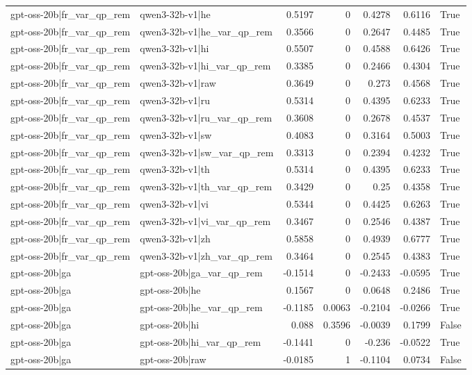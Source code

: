 \begin{table}
\begin{tabular}{l l r r r r l}
gpt-oss-20b|fr_var_qp_rem & qwen3-32b-v1|he & 0.5197 & 0 & 0.4278 & 0.6116 & True \\
gpt-oss-20b|fr_var_qp_rem & qwen3-32b-v1|he_var_qp_rem & 0.3566 & 0 & 0.2647 & 0.4485 & True \\
gpt-oss-20b|fr_var_qp_rem & qwen3-32b-v1|hi & 0.5507 & 0 & 0.4588 & 0.6426 & True \\
gpt-oss-20b|fr_var_qp_rem & qwen3-32b-v1|hi_var_qp_rem & 0.3385 & 0 & 0.2466 & 0.4304 & True \\
gpt-oss-20b|fr_var_qp_rem & qwen3-32b-v1|raw & 0.3649 & 0 & 0.273 & 0.4568 & True \\
gpt-oss-20b|fr_var_qp_rem & qwen3-32b-v1|ru & 0.5314 & 0 & 0.4395 & 0.6233 & True \\
gpt-oss-20b|fr_var_qp_rem & qwen3-32b-v1|ru_var_qp_rem & 0.3608 & 0 & 0.2678 & 0.4537 & True \\
gpt-oss-20b|fr_var_qp_rem & qwen3-32b-v1|sw & 0.4083 & 0 & 0.3164 & 0.5003 & True \\
gpt-oss-20b|fr_var_qp_rem & qwen3-32b-v1|sw_var_qp_rem & 0.3313 & 0 & 0.2394 & 0.4232 & True \\
gpt-oss-20b|fr_var_qp_rem & qwen3-32b-v1|th & 0.5314 & 0 & 0.4395 & 0.6233 & True \\
gpt-oss-20b|fr_var_qp_rem & qwen3-32b-v1|th_var_qp_rem & 0.3429 & 0 & 0.25 & 0.4358 & True \\
gpt-oss-20b|fr_var_qp_rem & qwen3-32b-v1|vi & 0.5344 & 0 & 0.4425 & 0.6263 & True \\
gpt-oss-20b|fr_var_qp_rem & qwen3-32b-v1|vi_var_qp_rem & 0.3467 & 0 & 0.2546 & 0.4387 & True \\
gpt-oss-20b|fr_var_qp_rem & qwen3-32b-v1|zh & 0.5858 & 0 & 0.4939 & 0.6777 & True \\
gpt-oss-20b|fr_var_qp_rem & qwen3-32b-v1|zh_var_qp_rem & 0.3464 & 0 & 0.2545 & 0.4383 & True \\
gpt-oss-20b|ga & gpt-oss-20b|ga_var_qp_rem & -0.1514 & 0 & -0.2433 & -0.0595 & True \\
gpt-oss-20b|ga & gpt-oss-20b|he & 0.1567 & 0 & 0.0648 & 0.2486 & True \\
gpt-oss-20b|ga & gpt-oss-20b|he_var_qp_rem & -0.1185 & 0.0063 & -0.2104 & -0.0266 & True \\
gpt-oss-20b|ga & gpt-oss-20b|hi & 0.088 & 0.3596 & -0.0039 & 0.1799 & False \\
gpt-oss-20b|ga & gpt-oss-20b|hi_var_qp_rem & -0.1441 & 0 & -0.236 & -0.0522 & True \\
gpt-oss-20b|ga & gpt-oss-20b|raw & -0.0185 & 1 & -0.1104 & 0.0734 & False \\

\end{tabular}
\end{table}
